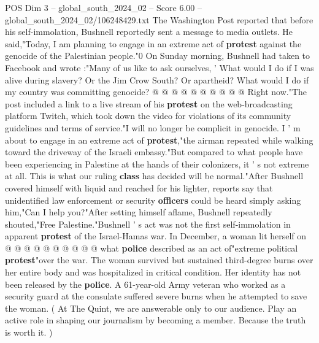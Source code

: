 \begin{textsample}{POS Dim 3 – global\_south\_2024\_02 – Score 6.00 – global\_south\_2024\_02/106248429.txt}
The Washington Post reported that before his self-immolation, Bushnell reportedly sent a message to media outlets.
He said,"Today, I am planning to engage in an extreme act of \textbf{protest} against the genocide of the Palestinian people."0 On Sunday morning, Bushnell had taken to Facebook and wrote :"Many of us like to ask ourselves, ' What would I do if I was alive during slavery?
Or the Jim Crow South?
Or apartheid?
What would I do if my country was committing genocide? @ @ @ @ @ @ @ @ @ @ Right now."The post included a link to a live stream of his \textbf{protest} on the web-broadcasting platform Twitch, which took down the video for violations of its community guidelines and terms of service."I will no longer be complicit in genocide.
I ' m about to engage in an extreme act of \textbf{protest},"the airman repeated while walking toward the driveway of the Israeli embassy."But compared to what people have been experiencing in Palestine at the hands of their colonizers, it ' s not extreme at all.
This is what our ruling \textbf{class} has decided will be normal."After Bushnell covered himself with liquid and reached for his lighter, reports say that unidentified law enforcement or security \textbf{officers} could be heard simply asking him,"Can I help you?"After setting himself aflame, Bushnell repeatedly shouted,"Free Palestine."Bushnell ' s act was not the first self-immolation in apparent \textbf{protest} of the Israel-Hamas war.
In December, a woman lit herself on @ @ @ @ @ @ @ @ @ @ what \textbf{police} described as an act of"extreme political \textbf{protest}"over the war.
The woman survived but sustained third-degree burns over her entire body and was hospitalized in critical condition.
Her identity has not been released by the \textbf{police}.
A 61-year-old Army veteran who worked as a security guard at the consulate suffered severe burns when he attempted to save the woman. ( At The Quint, we are answerable only to our audience.
Play an active role in shaping our journalism by becoming a member.
Because the truth is worth it. )

\end{textsample}
